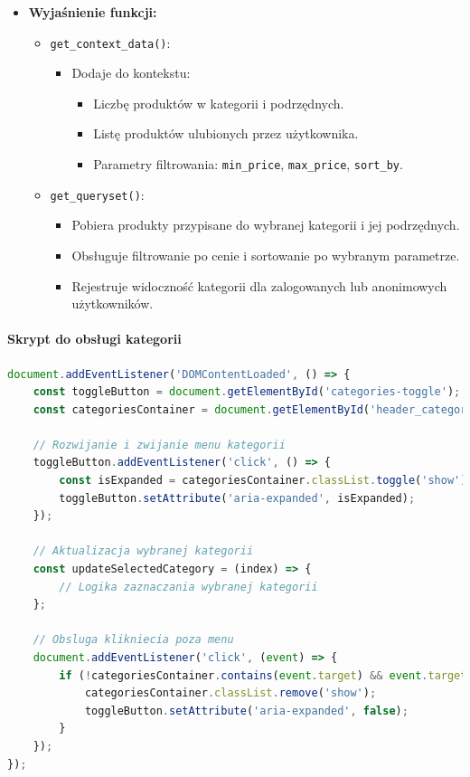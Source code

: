 \documentclass[12pt,a4paper,oneside]{article}
\theoremstyle{definition}
\numberwithin{equation}{section}
\begin{document}
\begin{itemize}
    \item \textbf{Wyjaśnienie funkcji:}
    \begin{itemize}
        \item \texttt{get\_context\_data()}:
        \begin{itemize}
            \item Dodaje do kontekstu:
            \begin{itemize}
                \item Liczbę produktów w kategorii i podrzędnych.
                \item Listę produktów ulubionych przez użytkownika.
                \item Parametry filtrowania: \texttt{min\_price}, \texttt{max\_price}, \texttt{sort\_by}.
            \end{itemize}
        \end{itemize}
        \item \texttt{get\_queryset()}:
        \begin{itemize}
            \item Pobiera produkty przypisane do wybranej kategorii i jej podrzędnych.
            \item Obsługuje filtrowanie po cenie i sortowanie po wybranym parametrze.
            \item Rejestruje widoczność kategorii dla zalogowanych lub anonimowych użytkowników.
        \end{itemize}
    \end{itemize}
\end{itemize}
\paragraph{Skrypt do obsługi kategorii}
\begin{lstlisting}[language=JavaScript, caption=Skrypt kategorii]
document.addEventListener('DOMContentLoaded', () => {
    const toggleButton = document.getElementById('categories-toggle');
    const categoriesContainer = document.getElementById('header_categories');

    // Rozwijanie i zwijanie menu kategorii
    toggleButton.addEventListener('click', () => {
        const isExpanded = categoriesContainer.classList.toggle('show');
        toggleButton.setAttribute('aria-expanded', isExpanded);
    });

    // Aktualizacja wybranej kategorii
    const updateSelectedCategory = (index) => {
        // Logika zaznaczania wybranej kategorii
    };

    // Obsluga klikniecia poza menu
    document.addEventListener('click', (event) => {
        if (!categoriesContainer.contains(event.target) && event.target !== toggleButton) {
            categoriesContainer.classList.remove('show');
            toggleButton.setAttribute('aria-expanded', false);
        }
    });
});
\end{lstlisting}
\end{document}
